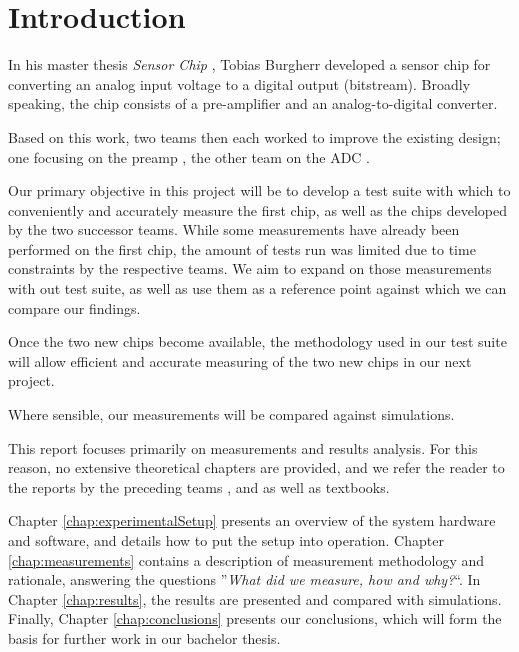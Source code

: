 \chapter{Introduction}
\label{ch:introduction}



In his  master thesis \emph{Sensor Chip}  \cite{ref:burgherr}, Tobias Burgherr
developed a  sensor chip for converting  an analog input voltage  to a digital
output (bitstream). Broadly speaking, the chip consists of a pre-amplifier and
an analog-to-digital converter.

Based on this work, two teams then each worked to improve the existing design;
one  focusing on  the  preamp  \cite{ref:gloor}, the  other  team  on the  ADC
\cite{ref:baier}.

Our primary  objective in this  project will be to  develop a test  suite with
which to  conveniently and accurately measure  the first chip, as  well as the
chips  developed by  the  two successor  teams. While  some measurements  have
already been performed on the first chip,  the amount of tests run was limited
due to time  constraints by the respective  teams.  We aim to  expand on those
measurements with  out test suite,  as well as use  them as a  reference point
against which we can compare our findings.

Once the  two new  chips become  available, the methodology  used in  our test
suite will allow efficient and accurate measuring  of the two new chips in our
next project.

Where sensible, our measurements will be compared against simulations.

This  report  focuses  primarily  on measurements  and  results  analysis. For
this  reason, no  extensive theoretical  chapters are  provided, and  we refer
the  reader  to  the  reports  by  the  preceding  teams  \cite{ref:burgherr},
\cite{ref:gloor} and \cite{ref:baier} as well as textbooks.

Chapter  \ref{chap:experimentalSetup}  presents  an  overview  of  the  system
hardware   and   software,  and   details   how   to   put  the   setup   into
operation. Chapter   \ref{chap:measurements}   contains   a   description   of
measurement  methodology and  rationale,  answering  the questions  ''\emph{What
did   we  measure,   how   and  why?}``. In   Chapter  \ref{chap:results},   the
results  are   presented  and  compared  with   simulations. Finally,  Chapter
\ref{chap:conclusions} presents our conclusions, which will form the basis for
further work in our bachelor thesis.
